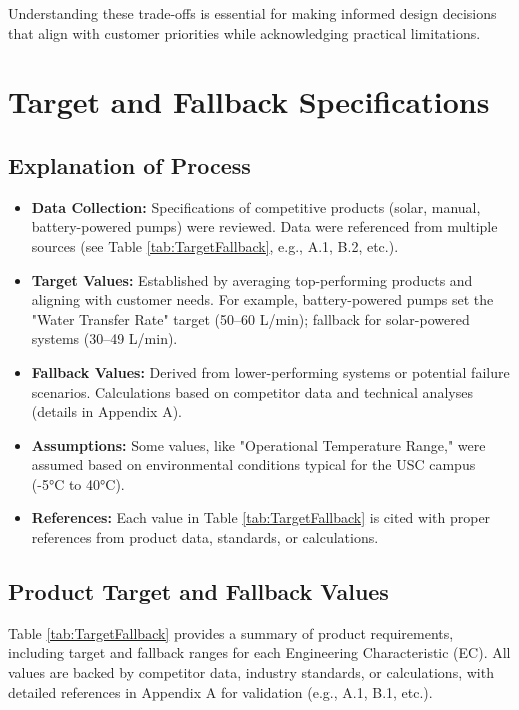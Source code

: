\documentclass[12pt]{report}
\begin{document}
Understanding these trade-offs is essential for making informed design decisions that align with customer priorities while acknowledging practical limitations.

\section{Target and Fallback Specifications}

\subsection{Explanation of Process}

\begin{itemize}
    \item \textbf{Data Collection:} Specifications of competitive products (solar, manual, battery-powered pumps) were reviewed. Data were referenced from multiple sources (see Table \ref{tab:TargetFallback}, e.g., A.1, B.2, etc.).

    \item \textbf{Target Values:} Established by averaging top-performing products and aligning with customer needs. For example, battery-powered pumps set the "Water Transfer Rate" target (50--60 L/min); fallback for solar-powered systems (30--49 L/min).

    \item \textbf{Fallback Values:} Derived from lower-performing systems or potential failure scenarios. Calculations based on competitor data and technical analyses (details in Appendix A).

    \item \textbf{Assumptions:} Some values, like "Operational Temperature Range," were assumed based on environmental conditions typical for the USC campus (-5°C to 40°C).

    \item \textbf{References:} Each value in Table \ref{tab:TargetFallback} is cited with proper references from product data, standards, or calculations.

\end{itemize}
\subsection{Product Target and Fallback Values}

Table \ref{tab:TargetFallback} provides a summary of product requirements, including target and fallback ranges for each Engineering Characteristic (EC). All values are backed by competitor data, industry standards, or calculations, with detailed references in Appendix A for validation (e.g., A.1, B.1, etc.).
\end{document}
